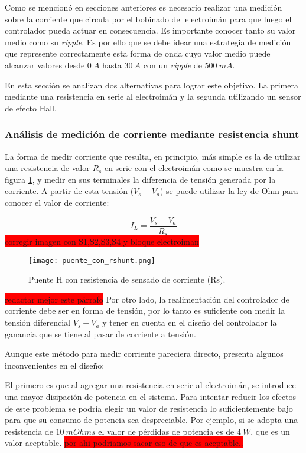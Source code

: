 Como se mencionó en secciones anteriores es necesario realizar una medición sobre la corriente que circula por el bobinado del electroimán para que luego el controlador pueda actuar en consecuencia. Es importante conocer tanto su valor medio como su \textsl{ripple}. Es por ello que se debe idear una estrategia de medición que represente correctamente esta forma de onda cuyo valor medio puede alcanzar valores desde $0\:A$ hasta $30\:A$ con un \textsl{ripple} de $500\:mA$.

En esta sección se analizan dos alternativas para lograr este objetivo. La primera mediante una resistencia en serie al electroimán y la segunda utilizando un sensor de efecto Hall.


\subsubsection{Análisis de medición de corriente mediante resistencia shunt}
La forma de medir corriente que resulta, en principio, más simple es la de utilizar una resistencia de valor $R_s$ en serie con el electroimán como se muestra en la figura \ref{fig:img_puente_con_rshunt}, y medir en sus terminales la diferencia de tensión generada por la corriente. A partir de esta tensión ($V_s-V_a$) se puede utilizar la ley de Ohm para conocer el valor de corriente:

\begin{equation}
	I_L=\frac{V_s-V_a}{R_s}
\end{equation}
\colorbox{red}{corregir imagen con S1,S2,S3,S4 y bloque electroiman}

\begin{figure}[H]
	\centering
	\texttt{[image: puente\_con\_rshunt.png]}
	\caption{Puente H con resistencia de sensado de corriente (Rs).}
	\label{fig:img_puente_con_rshunt}
\end{figure}
\colorbox{red}{redactar mejor este párrafo}
Por otro lado, la realimentación del controlador de corriente debe ser en forma de tensión, por lo tanto es suficiente con medir la tensión diferencial $V_s-V_a$ y tener en cuenta en el diseño del controlador la ganancia que se tiene al pasar de corriente a tensión.

Aunque este método para medir corriente pareciera directo, presenta algunos inconvenientes en el diseño:

El primero es que al agregar una resistencia en serie al electroimán, se introduce una mayor disipación de potencia en el sistema. Para intentar reducir los efectos de este problema se podría elegir un valor de resistencia lo suficientemente bajo para que su consumo de potencia sea despreciable. Por ejemplo, si se adopta una resistencia de $10\:mOhms$ el valor de pérdidas de potencia es de $4\:W$, que es un valor aceptable. \colorbox{red}{por ahi podriamos sacar eso de que es aceptable..}

